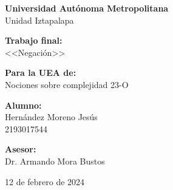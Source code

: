 \begin{titlepage}
\begin{center}

{\LARGE \textbf{Universidad Autónoma Metropolitana}} \\
{\Large Unidad Iztapalapa} \vspace{3cm}

{\Large \textbf{Trabajo final:}} \\
{\Large <<Negación>>} \vspace{2cm}

{\Large \textbf{Para la UEA de:}} \\
{\Large Nociones sobre complejidad 23-O} \vspace{2cm}

{\Large \textbf{Alumno:}} \\
{\Large Hernández Moreno Jesús \\
2193017544} \vspace{2cm}

{\Large \textbf{Asesor:}} \\
{\Large Dr. Armando Mora Bustos} \vfill
 
{\Large 12 de febrero de 2024}

\end{center}   
\end{titlepage}